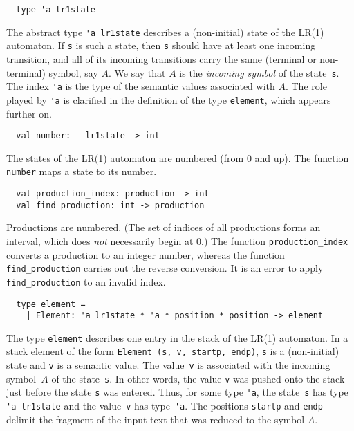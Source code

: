\documentclass[onecolumn,11pt,nocopyrightspace,preprint]{sigplanconf}
\begin{document}
\begin{verbatim}
  type 'a lr1state
\end{verbatim}

The abstract type \verb+'a lr1state+ describes a (non-initial) state of the
LR(1) automaton.
%
If \verb+s+ is such a state, then \verb+s+ should have at least one incoming
transition, and all of its incoming transitions carry the same (terminal or
non-terminal) symbol, say $A$. We say that $A$ is the \emph{incoming symbol}
of the state~\verb+s+.
%
The index \verb+'a+ is the type of the semantic values associated with $A$.
The role played by \verb+'a+ is clarified in the definition of the
type \verb+element+, which appears further on.


\begin{verbatim}
  val number: _ lr1state -> int
\end{verbatim}

The states of the LR(1) automaton are numbered (from 0 and up).
The function \verb+number+ maps a state to its number.


\begin{verbatim}
  val production_index: production -> int
  val find_production: int -> production
\end{verbatim}

Productions are numbered. (The set of indices of all productions forms an
interval, which does \emph{not} necessarily begin at 0.)
%
The function \verb+production_index+ converts a production to an integer
number, whereas the function \verb+find_production+ carries out the reverse
conversion. It is an error to apply \verb+find_production+ to an invalid
index.


\begin{verbatim}
  type element =
    | Element: 'a lr1state * 'a * position * position -> element
\end{verbatim}

The type \verb+element+ describes one entry in the stack of the LR(1)
automaton. In a stack element of the form \verb+Element (s, v, startp, endp)+,
\verb+s+ is a (non-initial) state and \verb+v+ is a semantic value. The
value~\verb+v+ is associated with the incoming symbol~$A$ of the
state~\verb+s+. In other words, the value \verb+v+ was pushed onto the stack
just before the state \verb+s+ was entered. Thus, for some type \verb+'a+, the
state~\verb+s+ has type \verb+'a lr1state+ and the value~\verb+v+ has
type~\verb+'a+. The positions \verb+startp+ and \verb+endp+ delimit the
fragment of the input text that was reduced to the symbol $A$.
\end{document}
